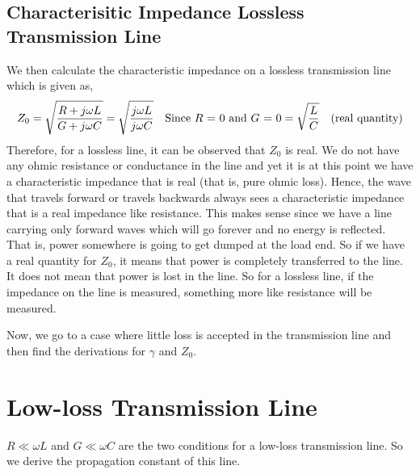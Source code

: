 \subsection{Characterisitic Impedance Lossless Transmission Line}
We then calculate the characteristic impedance on a lossless transmission line which is given as,
\begin{dmath*}
Z_0 = \sqrt{\frac{R + j\omega L}{G + j\omega C}}
= \sqrt{\frac{j\omega L}{j\omega C}}\quad\text{Since }R\text{ = }0\text{ and }G\text{ = }0
= \sqrt{\frac{L}{C}} \quad\textnormal{(real quantity)}
\end{dmath*}
Therefore, for a lossless line, it can be observed that $Z_0$ is real. We do not have any ohmic resistance or conductance in the line and yet it is at this point we have a characteristic impedance that is real (that is, pure ohmic loss). Hence, the wave that travels forward or travels backwards always sees a characteristic impedance that is a real impedance like resistance. This makes sense since we have a line carrying only forward waves which will go forever and no energy is reflected. That is, power somewhere is going to get dumped at the load end. So if we have a real quantity for $Z_0$, it means that power is completely transferred to the line. It does not mean that power is lost in the line. So for a lossless line, if the impedance on the line is measured, something more like resistance will be measured.

Now, we go to a case where little loss is accepted in the transmission line and then find the derivations for $\gamma$ and $Z_0$.

\section{Low-loss Transmission Line}
$R\ll\omega L$ and $G\ll\omega C$ are the two conditions for a low-loss transmission line. So we derive the propagation constant of this line.

